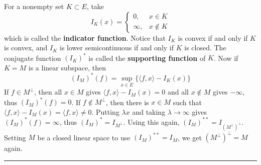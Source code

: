 \begin{exmp} For a nonempty set $K\subset E$, take
\begin{equation}
I_K(x)=\begin{cases}0,&x\in K\\
\infty,&x\notin K
\end{cases}
\end{equation}
which is called the \textbf{indicator function}. Notice that $I_K$ is convex if and only if $K$ is convex, and $I_K$ is lower semicontinuous if and only if $K$ is closed. The conjugate function $(I_K)^*$ is called the \textbf{supporting function} of $K$. Now if $K=M$ is a linear subspace, then
\begin{equation}
(I_M)^*(f)=\sup_{x\in E}\{\langle f,x\rangle-I_K(x)\}
\end{equation}
If $f\in M^{\perp}$, then all $x\in M$ gives $\langle f,x\rangle-I_M(x)=0$ and all $x\notin M$ gives $-\infty$, thus $(I_M)^*(f)=0$. If $f\notin M^{\perp}$, then there is $x\in M$ such that $\langle f,x\rangle-I_M(x)=\langle f,x\rangle\neq 0$. Putting $\lambda x$ and taking $\lambda\rightarrow \infty$ gives $(I_M)^*(f)=\infty$, thus $(I_M)^*=I_{M^\perp}$. Using this again, $(I_M)^{**}=I_{(M^\perp)^\perp}$. Setting $M$ be a closed linear space to use $(I_M)^{**}=I_M$, we get $(M^\perp)^\perp=M$ again. 
\end{exmp}
\noindent\rule{\textwidth}{1pt}
\newline